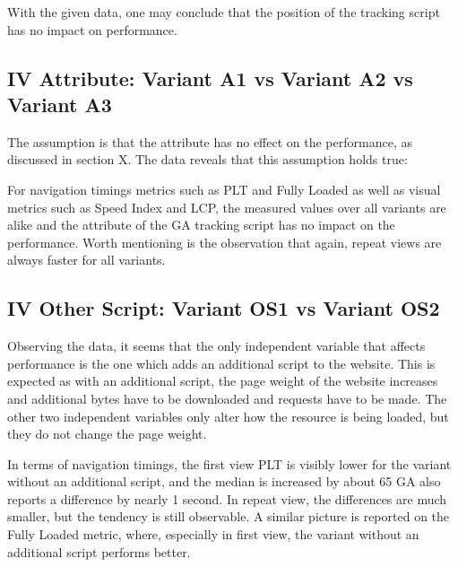 
With the given data, one may conclude that the position of the tracking script has no impact on performance.




\subsection{IV Attribute: Variant A1 vs Variant A2 vs Variant A3}

The assumption is that the attribute has no effect on the performance, as discussed in section X.
The data reveals that this assumption holds true:

For navigation timings metrics such as PLT and Fully Loaded as well as visual metrics such as Speed Index and LCP, the measured values over all variants are alike and the attribute of the GA tracking script has no impact on the performance.
Worth mentioning is the observation that again, repeat views are always faster for all variants.





\subsection{IV Other Script: Variant OS1 vs Variant OS2}


Observing the data, it seems that the only independent variable that affects performance is the one which adds an additional script to the website.
This is expected as with an additional script, the page weight of the website increases and additional bytes have to be downloaded and requests have to be made.
The other two independent variables only alter how the resource is being loaded, but they do not change the page weight.


In terms of navigation timings, the first view PLT is visibly lower for the variant without an additional script, and the median is increased by about 65 %
GA also reports a difference by nearly 1 second.
In repeat view, the differences are much smaller, but the tendency is still observable.
A similar picture is reported on the Fully Loaded metric, where, especially in first view, the variant without an additional script performs better.

